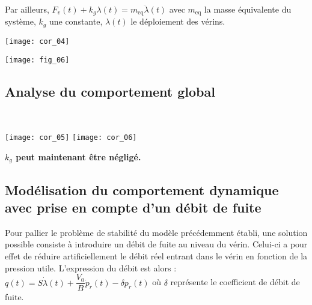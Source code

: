 Par ailleurs, $F_v(t)+k_g \lambda(t)=m_{\text{eq}}\ddot{\lambda}(t)$ avec $m_{\text{eq}}$ la masse équivalente du système, $k_g$ une constante, $\lambda(t)$ le déploiement des vérins.



\ifprof
\begin{corrige}
\begin{center}
\texttt{[image: cor\_04]}
\end{center}    
\end{corrige}
\else
\fi
\begin{center}
\texttt{[image: fig\_06]}
\end{center}


\subsection*{Analyse du comportement global}


\ifprof
\begin{corrige} ~\\
\begin{center}
\texttt{[image: cor\_05]}
\texttt{[image: cor\_06]}
\end{center}
\end{corrige}
\else
\fi

\textbf{$k_g$ peut maintenant être négligé.}

\subsection*{Modélisation du comportement dynamique avec prise en compte d'un débit de fuite}
Pour pallier le problème de stabilité du modèle précédemment établi, une solution possible consiste à introduire un débit de fuite au niveau du vérin. Celui-ci a pour effet de réduire artificiellement le débit réel entrant dans le vérin en fonction de la pression utile. L'expression du débit est alors : 
$q(t)=S\dot{\lambda}(t)+\dfrac{V_0}{B} \dot{p}_r(t)-\delta p_r(t)$ où $\delta$ représente le coefficient de débit de fuite.


